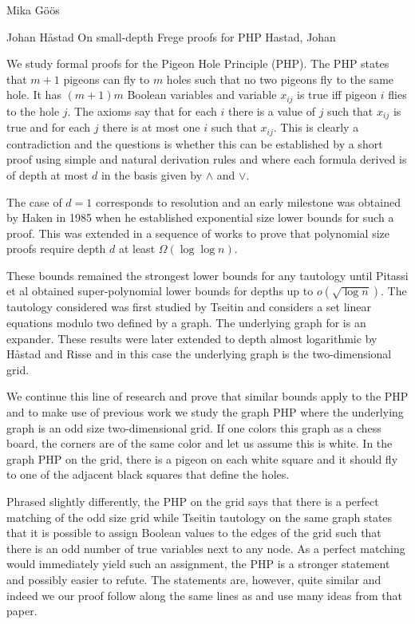 \documentclass[report]{owrart}
\begin{document}
\begin{report}
\begin{talk}{Mika G\"o\"os}
  \end{talk}


  \begin{talk}{Johan H\aa stad}
    {On small-depth Frege proofs for PHP}
    {Hastad, Johan}
    
    \noindent
   
    We study formal proofs for the Pigeon Hole Principle (PHP).
The PHP states that $m+1$ pigeons can 
fly to $m$ holes such that no two pigeons fly to the
same hole.  It has $(m+1)m$ Boolean variables and variable $x_{ij}$
is true iff pigeon $i$ flies to the hole $j$.
The axioms say that for each $i$ there is a value
of $j$ such that $x_{ij}$ is true and for 
each $j$ there is at most one $i$ such that $x_{ij}$.
This is clearly a contradiction and the questions
is whether this can be established by a short
proof using simple and natural derivation rules
and where each formula derived is of depth at most
$d$ in the basis given by $\land$ and $\lor$.

The case of $d=1$ corresponds to resolution and an
early milestone was obtained by Haken \cite{haken} in 1985
when he established exponential size lower bounds for
such a proof.  This was extended
in a sequence of works \cite{ajtai,bpu92,kpw95,pbi93}
to prove that polynomial size proofs require depth $d$
at least $\Omega (\log {\log n})$.

These bounds remained the strongest lower bounds for any
tautology until Pitassi et al \cite{prst16}
obtained super-polynomial lower bounds for
depths up to $o(\sqrt {\log n})$.
The tautology considered was first studied by Tseitin \cite{tseitin}
and considers a set linear equations modulo two defined
by a graph.  The underlying graph for
\cite{prst16} is an expander.  These results were
later extended to depth almost logarithmic
by H{\aa}stad and Risse \cite{jhtseitin,jhkr}
and in this case the underlying graph is the two-dimensional grid.

We continue this line of research and prove that similar
bounds apply to the PHP and to make use of previous work we study the
graph PHP where the underlying graph is an odd size
two-dimensional grid.
If one colors this graph as a chess board,  the corners are of the same color and
let us assume this is white.
In the graph PHP on the grid, there is a pigeon on each white square and
it should fly to one of the adjacent black squares
that define the holes.   

Phrased slightly differently, the PHP on the grid says that
there is a perfect matching of the odd size grid while
Tseitin tautology on the same graph states that it is possible to
assign Boolean values
to the edges of the grid such that there is an odd number
of true variables next to any node.  As a perfect matching
would immediately yield such an assignment, the PHP is a stronger
statement and possibly easier to refute.  The statements
are, however, quite similar and indeed we our proof
follow along the same lines as \cite{jhkr} and use
many ideas from that paper.


\end{talk}
\end{report}
\end{document}
